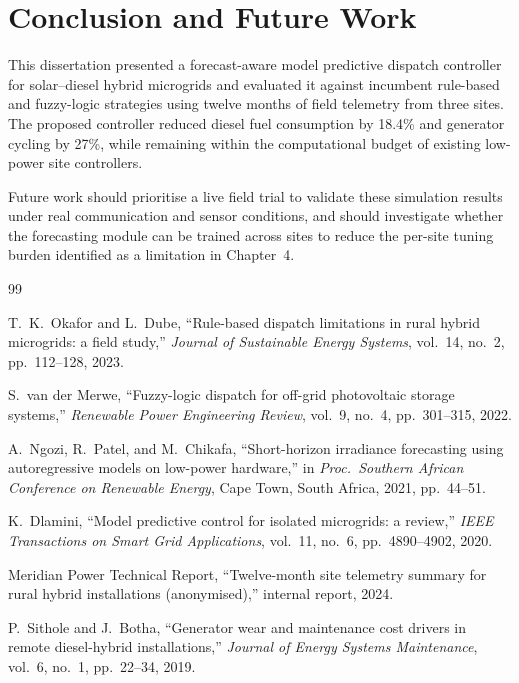 \chapter{Conclusion and Future Work}

This dissertation presented a forecast-aware model predictive dispatch controller for
solar--diesel hybrid microgrids and evaluated it against incumbent rule-based and fuzzy-logic
strategies using twelve months of field telemetry from three sites. The proposed controller
reduced diesel fuel consumption by 18.4\% and generator cycling by 27\%, while remaining within
the computational budget of existing low-power site controllers.

Future work should prioritise a live field trial to validate these simulation results under
real communication and sensor conditions, and should investigate whether the forecasting
module can be trained across sites to reduce the per-site tuning burden identified as a
limitation in Chapter~4.

\begin{thebibliography}{99}

 T.~K.~Okafor and L.~Dube, ``Rule-based dispatch limitations in rural
hybrid microgrids: a field study,'' \textit{Journal of Sustainable Energy Systems}, vol.~14,
no.~2, pp.~112--128, 2023.

 S.~van der Merwe, ``Fuzzy-logic dispatch for off-grid photovoltaic
storage systems,'' \textit{Renewable Power Engineering Review}, vol.~9, no.~4, pp.~301--315,
2022.

 A.~Ngozi, R.~Patel, and M.~Chikafa, ``Short-horizon irradiance forecasting
using autoregressive models on low-power hardware,'' in \textit{Proc.\ Southern African
Conference on Renewable Energy}, Cape Town, South Africa, 2021, pp.~44--51.

 K.~Dlamini, ``Model predictive control for isolated microgrids: a
review,'' \textit{IEEE Transactions on Smart Grid Applications}, vol.~11, no.~6,
pp.~4890--4902, 2020.

 Meridian Power Technical Report, ``Twelve-month site telemetry summary
for rural hybrid installations (anonymised),'' internal report, 2024.

 P.~Sithole and J.~Botha, ``Generator wear and maintenance cost drivers
in remote diesel-hybrid installations,'' \textit{Journal of Energy Systems Maintenance},
vol.~6, no.~1, pp.~22--34, 2019.

\end{thebibliography}
